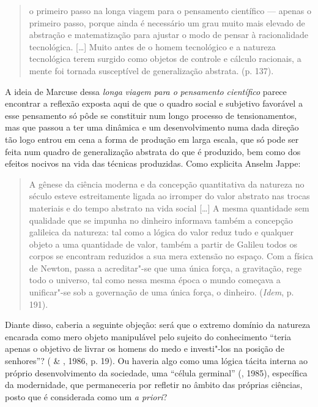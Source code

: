 \begin{quote}
o primeiro passo na longa viagem para o pensamento científico --- apenas
o primeiro passo, porque ainda é necessário um grau muito mais elevado
de abstração e matematização para ajustar o modo de pensar à
racionalidade tecnológica. [\ldots{}] Muito antes de o homem tecnológico
e a natureza tecnológica terem surgido como objetos de controle e
cálculo racionais, a mente foi tornada susceptível de generalização
abstrata. (p. 137).
\end{quote}

A ideia de Marcuse dessa \emph{longa} \emph{viagem para o}
\emph{pensamento} \emph{científico} parece encontrar a reflexão exposta aqui
de que o quadro social e subjetivo favorável a esse pensamento
só pôde se constituir num longo processo de tensionamentos, mas que
passou a ter uma dinâmica e um desenvolvimento numa dada direção tão
logo entrou em cena a forma de produção em larga escala, que só pode ser
feita num quadro de generalização abstrata do que é produzido, bem como
dos efeitos nocivos na vida das técnicas produzidas. Como explicita
Anselm Jappe:

\begin{quote}
A gênese da ciência moderna e da concepção quantitativa da natureza no
século  esteve estreitamente ligada ao irromper do valor abstrato
nas trocas materiais e do tempo abstrato na vida social [\ldots{}] A
mesma quantidade sem qualidade que se impunha no dinheiro informava
também a concepção galileica da natureza: tal como a lógica do valor
reduz tudo e qualquer objeto a uma quantidade de valor, também a partir
de Galileu todos os corpos se encontram reduzidos a sua mera extensão no
espaço. Com a física de Newton, passa a acreditar"-se que uma única
força, a gravitação, rege todo o universo, tal como nessa mesma época o
mundo começava a unificar"-se sob a governação de uma única força, o
dinheiro. (\emph{Idem}, p. 191).
\end{quote}

Diante disso, caberia a seguinte objeção: será que o extremo domínio da
natureza encarada como mero objeto manipulável pelo sujeito do
conhecimento ``teria apenas o objetivo de livrar os homens do medo e
investi"-los na posição de senhores''? ( \& , 1986, p.
19). Ou haveria algo como uma lógica tácita interna ao próprio
desenvolvimento da sociedade, uma ``célula germinal'' (, 1985),
específica da modernidade, que permaneceria por refletir no âmbito das
próprias ciências, posto que é considerada como um \emph{a priori}?

